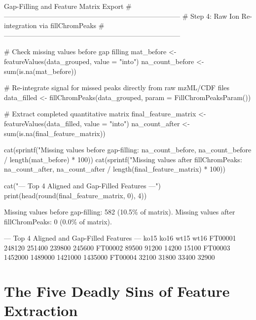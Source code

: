 \documentclass[11pt,twoside,openright]{book}
\begin{document}
\begin{rchunk}{Gap-Filling and Feature Matrix Export}
# -----------------------------------------------------------------------------
# Step 4: Raw Ion Re-integration via fillChromPeaks
# -----------------------------------------------------------------------------

# Check missing values before gap filling
mat_before <- featureValues(data_grouped, value = "into")
na_count_before <- sum(is.na(mat_before))

# Re-integrate signal for missed peaks directly from raw mzML/CDF files
data_filled <- fillChromPeaks(data_grouped, param = FillChromPeaksParam())

# Extract completed quantitative matrix
final_feature_matrix <- featureValues(data_filled, value = "into")
na_count_after <- sum(is.na(final_feature_matrix))

cat(sprintf("Missing values before gap-filling: %
            na_count_before, na_count_before / length(mat_before) * 100))
cat(sprintf("Missing values after fillChromPeaks: %
            na_count_after, na_count_after / length(final_feature_matrix) * 100))

cat("\n--- Top 4 Aligned and Gap-Filled Features ---\n")
print(head(round(final_feature_matrix, 0), 4))
\end{rchunk}

\begin{routput}
Missing values before gap-filling: 582 (10.5\% of matrix).
Missing values after fillChromPeaks: 0 (0.0\% of matrix).

--- Top 4 Aligned and Gap-Filled Features ---
             ko15    ko16    wt15    wt16
FT00001    248120  251400  239800  245600
FT00002     89500   91200   14200   15100
FT00003   1452000 1489000 1421000 1435000
FT00004     32100   31800   33400   32900
\end{routput}

\section{The Five Deadly Sins of Feature Extraction}
\end{document}
